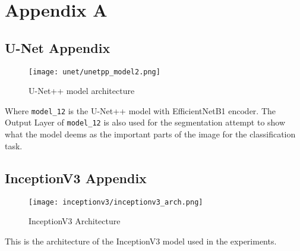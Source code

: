 \section{Appendix A}\label{sec:appendixA}

\subsection{U-Net Appendix}

\begin{figure}[H]
  \begin{center}
    \texttt{[image: unet/unetpp\_model2.png]}
  \end{center}
  \caption{U-Net++ model architecture}\label{fig:unetpp_model}
\end{figure}

Where \texttt{model\_12} is the U-Net++ model with EfficientNetB1 encoder. The Output Layer of \texttt{model\_12} is also used for the segmentation attempt to show what the model deems as the important parts of the image for the classification task.

\subsection{InceptionV3 Appendix}

\begin{figure}[H]
  \begin{center}
    \texttt{[image: inceptionv3/inceptionv3\_arch.png]}
  \end{center}
  \caption{InceptionV3 Architecture}\label{f:inceptionv3_arch}
\end{figure}

This is the architecture of the InceptionV3 model used in the experiments.

